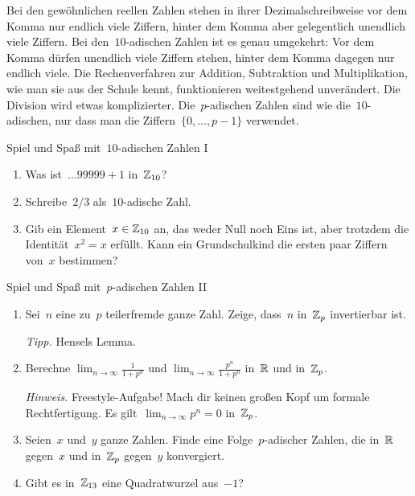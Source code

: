 \documentclass{uebblatt}
\begin{document}

{\small
Bei den gewöhnlichen reellen Zahlen stehen in ihrer Dezimalschreibweise vor dem
Komma nur endlich viele Ziffern, hinter dem Komma aber gelegentlich unendlich
viele Ziffern. Bei den~$10$-adischen Zahlen ist es genau umgekehrt: Vor dem
Komma dürfen unendlich viele Ziffern stehen, hinter dem Komma dagegen nur
endlich viele. Die Rechenverfahren zur Addition, Subtraktion und
Multiplikation, wie man sie aus der Schule kennt, funktionieren weitestgehend
unverändert. Die Division wird etwas komplizierter. Die~$p$-adischen Zahlen
sind wie die~$10$-adischen, nur dass man die Ziffern~$\{0,\ldots,p-1\}$
verwendet.\par}

\bigskip

\begin{aufgabe}{Spiel und Spaß mit~$10$-adischen Zahlen I}
\begin{enumerate}
\item Was ist~$\ldots 99999 + 1$ in~$\mathbb{Z}_{10}$?
\item Schreibe~$2/3$ als~$10$-adische Zahl.
\item Gib ein Element~$x \in \mathbb{Z}_{10}$ an, das weder Null noch Eins ist, aber trotzdem
die Identität~$x^2 = x$ erfüllt. Kann ein Grundschulkind die ersten paar
Ziffern von~$x$ bestimmen?
\end{enumerate}
\end{aufgabe}

\begin{aufgabe}{Spiel und Spaß mit~$p$-adischen Zahlen II}
\begin{enumerate}
\item Sei~$n$ eine zu~$p$ teilerfremde ganze Zahl. Zeige, dass~$n$ in~$\mathbb{Z}_p$
invertierbar ist.

{\tiny\emph{Tipp.} Hensels Lemma.\par}
\item Berechne $\lim_{n \to \infty} \frac{1}{1 + p^n}$ und $\lim_{n \to \infty}
\frac{p^n}{1 + p^n}$ in~$\mathbb{R}$ und in~$\mathbb{Z}_p$.

{\tiny\emph{Hinweis.} Freestyle-Aufgabe! Mach dir keinen großen Kopf um formale
Rechtfertigung. Es gilt~$\lim_{n \to \infty} p^n = 0$ in~$\mathbb{Z}_p$.\par}
\item Seien~$x$ und~$y$ ganze Zahlen. Finde eine Folge~$p$-adischer Zahlen, die
in~$\mathbb{R}$ gegen~$x$ und in~$\mathbb{Z}_p$ gegen~$y$ konvergiert.
\item Gibt es in~$\mathbb{Z}_{13}$ eine Quadratwurzel aus~$-1$?
\end{enumerate}
\end{aufgabe}
\end{document}
